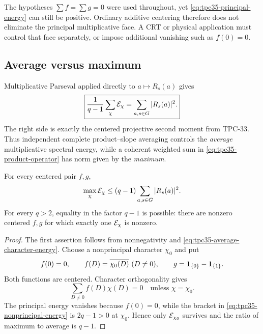 \begin{remark}
The hypotheses \(\sum f=\sum g=0\) were used throughout, yet
\eqref{eq:tpc35-principal-energy} can still be positive.  Ordinary
additive centering therefore does not eliminate the principal
multiplicative face.  A CRT or physical application must control that face
separately, or impose additional vanishing such as \(f(0)=0\).
\end{remark}

\subsection{Average versus maximum}

Multiplicative Parseval applied directly to \(a\mapsto R_s(a)\) gives
\begin{equation}
 \boxed{
 \frac1{q-1}\sum_\chi\mathcal E_\chi
 =\sum_{a,s\in G}|R_s(a)|^2.}
 \label{eq:tpc35-average-character-energy}
\end{equation}
The right side is exactly the centered projective second moment from
TPC-33.  Thus independent complete product--slope averaging controls the
\emph{average} multiplicative spectral energy, while a coherent weighted
sum in \eqref{eq:tpc35-product-operator} has norm given by the
\emph{maximum}.

\begin{corollary}
\label{cor:tpc35-average-max-factor}
For every centered pair \(f,g\),
\begin{equation}
 \max_\chi\mathcal E_\chi
 \le(q-1)\sum_{a,s\in G}|R_s(a)|^2.
 \label{eq:tpc35-average-max-upper}
\end{equation}
For every \(q>2\), equality in the factor \(q-1\) is possible: there are
nonzero centered \(f,g\) for which exactly one \(\mathcal E_\chi\) is nonzero.
\end{corollary}

\begin{proof}
The first assertion follows from nonnegativity and
\eqref{eq:tpc35-average-character-energy}.  Choose a nonprincipal
character \(\chi_0\) and put
\begin{equation}
 f(0)=0,\qquad f(D)=\overline{\chi_0(D)}\ (D\ne0),
 \qquad g=\mathbf 1_{\{0\}}-\mathbf 1_{\{1\}}.
 \label{eq:tpc35-single-character-example}
\end{equation}
Both functions are centered.  Character orthogonality gives
\[
 \sum_{D\ne0}f(D)\chi(D)=0
 \quad\text{unless }\chi=\chi_0.
\]
The principal energy vanishes because \(f(0)=0\), while the bracket in
\eqref{eq:tpc35-nonprincipal-energy} is \(2q-1>0\) at \(\chi_0\).
Hence only \(\mathcal E_{\chi_0}\) survives and the ratio of maximum to average
is \(q-1\).
\end{proof}

